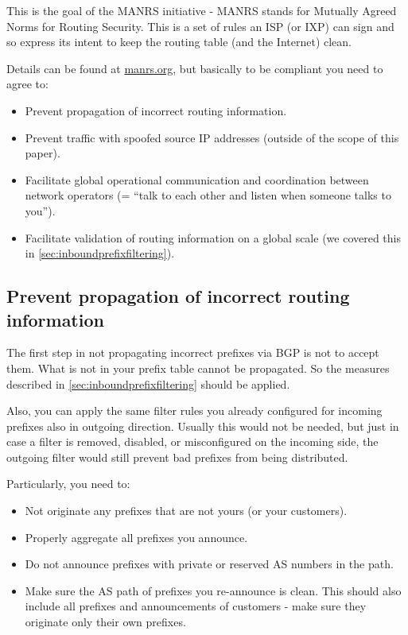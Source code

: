 This is the goal of the MANRS initiative - MANRS stands for Mutually Agreed Norms for Routing Security. This is a set of rules an ISP (or IXP) can sign and so express its intent to keep the routing table (and the Internet) clean.

Details can be found at \url{manrs.org}, but basically to be compliant you need to agree to:
\begin{itemize}
  \item Prevent propagation of incorrect routing information.
  \item Prevent traffic with spoofed source IP addresses (outside of the scope of this paper).
  \item Facilitate global operational communication and coordination between network operators (= ``talk to each other and listen when someone talks to you'').
  \item Facilitate validation of routing information on a global scale (we covered this in \ref{sec:inboundprefixfiltering}).
\end{itemize}

\subsection{Prevent propagation of incorrect routing information}
The first step in not propagating incorrect prefixes via BGP is not to accept them. What is not in your prefix table cannot be propagated. So the measures described in \ref{sec:inboundprefixfiltering} should be applied.

Also, you can apply the same filter rules you already configured for incoming prefixes also in outgoing direction. Usually this would not be needed, but just in case a filter is removed, disabled, or misconfigured on the incoming side, the outgoing filter would still prevent bad prefixes from being distributed.

Particularly, you need to:
\begin{itemize}
  \item Not originate any prefixes that are not yours (or your customers).
  \item Properly aggregate all prefixes you announce.
  \item Do not announce prefixes with private or reserved AS numbers in the path.
  \item Make sure the AS path of prefixes you re-announce is clean. This should also include all prefixes and announcements of customers - make sure they originate only their own prefixes.
\end{itemize}




